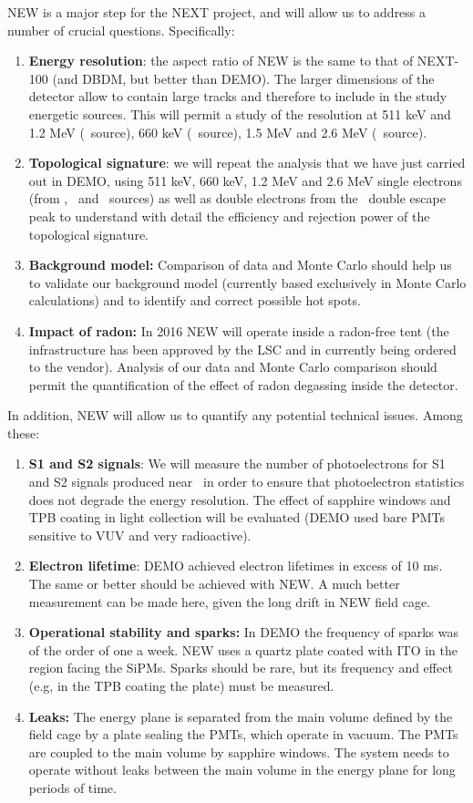 NEW is a major step for the NEXT project, and will allow us to address a number of crucial questions. Specifically:

\begin{enumerate}
\item {\bf Energy resolution}: the aspect ratio of NEW is the same to that of NEXT-100 (and DBDM, but better than DEMO). The larger dimensions of the detector allow to contain large tracks and therefore to include in the study energetic sources. This will permit a study of the resolution at 511 keV and 1.2 MeV (\NA\ source), 660 keV (\CS\ source), 1.5 MeV and 2.6 MeV (\THO\ source). 
\item {\bf Topological signature}: we will repeat the analysis that we have just carried out in DEMO, using 511 keV, 660 keV, 1.2 MeV and 2.6 MeV single electrons (from \NA, \CS\ and \THO\ sources) as well as double electrons from the \TL\ double escape peak to understand with detail the efficiency and rejection power of the topological signature. 
\item {\bf Background model:} Comparison of data and Monte Carlo should help us to validate our background model (currently based exclusively in Monte Carlo calculations) and to identify and correct possible hot spots.
 \item {\bf Impact of radon:} In 2016 NEW will operate inside a radon-free tent (the infrastructure has been approved by the LSC and in currently being ordered to the vendor). Analysis of our data and Monte Carlo comparison should permit the quantification of the effect of radon degassing inside the detector.
 \end{enumerate}

In addition, NEW will allow us to quantify any potential technical issues. Among these:
 
 \begin{enumerate}
\item {\bf S1 and S2 signals}: We will measure the number of photoelectrons for S1 and S2 signals produced near \Qbb\, in order to ensure that photoelectron statistics does not degrade the energy resolution. The effect of sapphire windows and TPB coating in light collection will be evaluated (DEMO used bare PMTs sensitive to VUV and very radioactive).  
\item {\bf Electron lifetime}: DEMO achieved electron lifetimes in excess of 10 ms. The same or better should be achieved with NEW. A much better measurement can be made here, given the long drift in NEW field cage. 
\item {\bf Operational stability and sparks:} In DEMO the frequency of sparks was of the order of one a week. NEW uses a quartz plate coated with ITO in the region facing the SiPMs. Sparks should be rare, but its frequency and effect (e.g, in the TPB coating the plate) must be measured. 
 \item {\bf Leaks:} The energy plane is separated from the main volume defined by the field cage by a plate sealing the PMTs, which operate in vacuum. The PMTs are coupled to the main volume by sapphire windows. The system needs to operate without leaks between the main volume in the energy plane for long periods of time.
 \end{enumerate}

